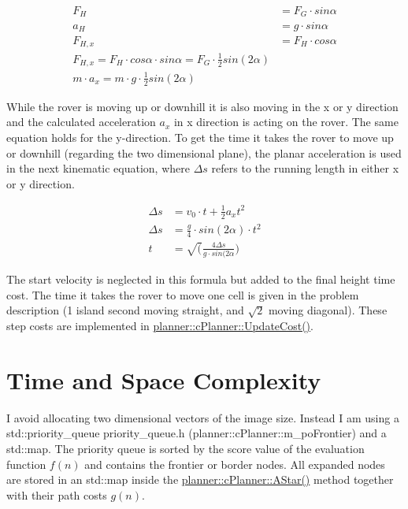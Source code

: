 \begin{eqnarray*} F_H &= F_G \cdot sin\alpha \\ a_H &= g \cdot sin\alpha \\ F_{H,x} &= F_H \cdot cos\alpha \\ F_{H,x} = F_H \cdot cos\alpha \cdot sin\alpha = F_G \cdot \frac{1}{2} sin(2\alpha) \\ m \cdot a_x = m \cdot g \cdot \frac{1}{2} sin(2\alpha) \end{eqnarray*}

While the rover is moving up or downhill it is also moving in the x or y direction and the calculated acceleration $a_x$ in x direction is acting on the rover. The same equation holds for the y-\/direction. To get the time it takes the rover to move up or downhill (regarding the two dimensional plane), the planar acceleration is used in the next kinematic equation, where $\Delta s$ refers to the running length in either x or y direction.

\begin{eqnarray*} \Delta s &= v_0 \cdot t + \frac{1}{2} a_x t^2 \\ \Delta s &= \frac{g}{4} \cdot sin(2\alpha) \cdot t^2 \\ t &= \sqrt(\frac{4 \Delta s}{g \cdot sin(2\alpha}) \end{eqnarray*}

The start velocity is neglected in this formula but added to the final height time cost. The time it takes the rover to move one cell is given in the problem description (1 island second moving straight, and $\sqrt 2$ moving diagonal). These step costs are implemented in \mbox{\hyperlink{classplanner_1_1c_planner_a16e8c156297fff49a6ba9b97073baffb}{planner\+::c\+Planner\+::\+Update\+Cost()}}.

\section*{Time and Space Complexity}

I avoid allocating two dimensional vectors of the image size. Instead I am using a std\+::priority\+\_\+queue priority\+\_\+queue.\+h (planner\+::c\+Planner\+::m\+\_\+po\+Frontier) and a std\+::map. The priority queue is sorted by the score value of the evaluation function $f(n)$ and contains the frontier or border nodes. All expanded nodes are stored in an std\+::map inside the \mbox{\hyperlink{classplanner_1_1c_planner_a341e70531266f023ac9461d18979d1ef}{planner\+::c\+Planner\+::\+A\+Star()}} method together with their path costs $g(n)$.

